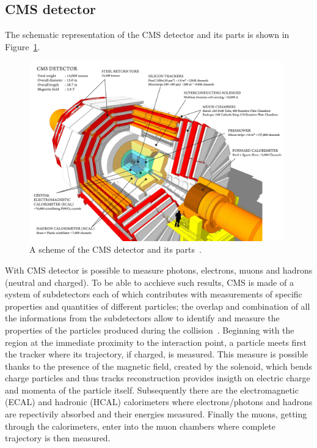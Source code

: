 \subsection{CMS detector}\label{sec:cmsdetector}
The schematic representation of the CMS detector and its parts is
shown in Figure~\ref{fig:detector}.
\begin{figure}[h]
\centering
\includegraphics[width=0.98\textwidth]{Figures/c2/cms_160312_06-compressed.pdf}
\vspace*{3mm}
\caption{A scheme of the CMS detector and its parts~\cite{webpage_cms}.}
\label{fig:detector}
\end{figure} 

With CMS detector is possible to measure photons, electrons, muons and hadrons (neutral and charged). 
To be able to acchieve such results, CMS is made of a system of subdetectors each of which contributes with
measurements of specific properties and quantities of different 
particles; the overlap and combination of all the
informations from the subdetectors allow to identify and measure the
properties of the particles produced during the collision~\cite{Sirunyan_2017}. Beginning
with the region at the immediate proximity to the interaction point, a
particle meets first the tracker where its trajectory, if charged, is
measured. This measure is possible thanks to the presence of the
magnetic field, created by the solenoid, which bends charge particles
and thus tracks reconstruction provides insigth on electric charge and
momenta of the particle itself. Subsequently there are the
electromagnetic (ECAL) and hadronic (HCAL) calorimeters where
electrons/photons and hadrons are repectivily absorbed and their
energies measured. Finally the muons, getting through the
calorimeters, enter into the muon chambers where complete trajectory
is then measured. 

